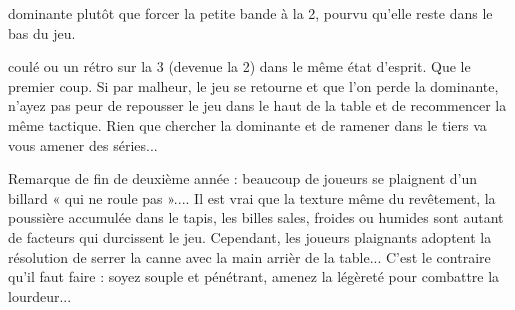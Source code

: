 dominante plutôt que forcer la petite bande à la 2, pourvu qu'elle reste
dans le bas du jeu.

coulé ou un rétro sur la 3 (devenue la 2) dans le même état d'esprit.
Que le premier coup. Si par malheur, le jeu se retourne et que l'on
perde la dominante, n'ayez pas peur de repousser le jeu dans le haut de
la table et de recommencer la même tactique. Rien que chercher la
dominante et de ramener dans le tiers va vous amener des séries...

Remarque de fin de deuxième année : beaucoup de joueurs se plaignent
d'un billard « qui ne roule pas ».... Il est vrai que la texture même du
revêtement, la poussière accumulée dans le tapis, les billes sales,
froides ou humides sont autant de facteurs qui durcissent le jeu.
Cependant, les joueurs plaignants adoptent la résolution de serrer la
canne avec la main arrièr de la table... C'est le contraire qu'il faut
faire : soyez souple et pénétrant, amenez la légèreté pour combattre la
lourdeur...
